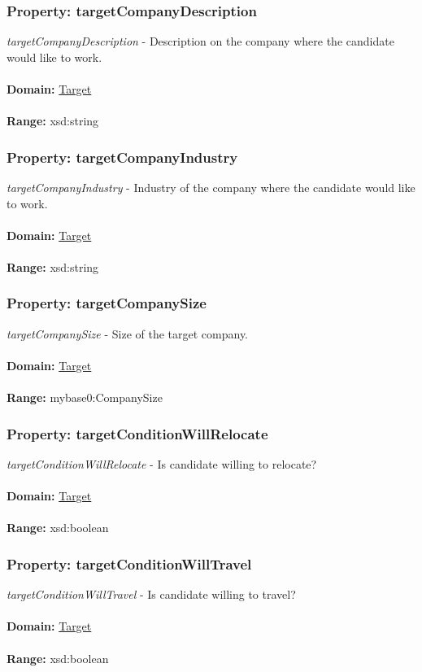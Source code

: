 \documentclass[a4paper,12pt]{article}
\numberwithin{equation}{section}
\begin{document}
\subsubsection{Property: targetCompanyDescription}\hypertarget{targetCompanyDescription}{}
\textit{targetCompanyDescription} - Description on the company where the candidate would like to work.
\\\\
\textbf{Domain:} \hyperlink{Target}{Target} 
\\\\
\textbf{Range:}  xsd:string 

\subsubsection{Property: targetCompanyIndustry}\hypertarget{targetCompanyIndustry}{}
\textit{targetCompanyIndustry} - Industry of the company where the candidate would like to work.
\\\\
\textbf{Domain:} \hyperlink{Target}{Target} 
\\\\
\textbf{Range:}  xsd:string 

\subsubsection{Property: targetCompanySize}\hypertarget{targetCompanySize}{}
\textit{targetCompanySize} - Size of the target company.
\\\\
\textbf{Domain:} \hyperlink{Target}{Target} 
\\\\
\textbf{Range:}  mybase0:CompanySize

\subsubsection{Property: targetConditionWillRelocate}\hypertarget{targetConditionWillRelocate}{}
\textit{targetConditionWillRelocate} - Is candidate willing to relocate?
\\\\
\textbf{Domain:} \hyperlink{Target}{Target} 
\\\\
\textbf{Range:}  xsd:boolean

\subsubsection{Property: targetConditionWillTravel}\hypertarget{targetConditionWillTravel}{}
\textit{targetConditionWillTravel} - Is candidate willing to travel?
\\\\
\textbf{Domain:} \hyperlink{Target}{Target} 
\\\\
\textbf{Range:}  xsd:boolean
\end{document}

